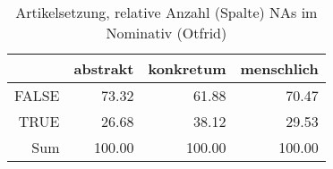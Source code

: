 \begin{table}[ht]
\centering
\begin{tabular}{rrrr}
  \hline
 & abstrakt & konkretum & menschlich \\ 
  \hline
FALSE & 73.32 & 61.88 & 70.47 \\ 
  TRUE & 26.68 & 38.12 & 29.53 \\ 
  Sum & 100.00 & 100.00 & 100.00 \\ 
   \hline
\end{tabular}
\caption{Artikelsetzung, relative Anzahl (Spalte) NAs im Nominativ (Otfrid)} 
\end{table}
